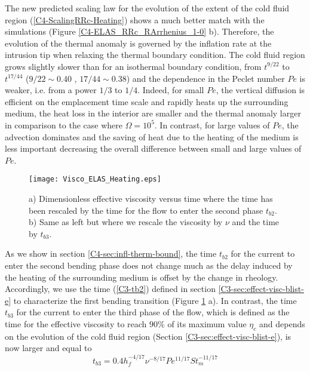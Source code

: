 The new predicted  scaling law for the evolution of  the extent of the
cold fluid  region (\ref{C4-ScalingRRc-Heating})  shows a  much better
match  with the  simulations (Figure  \ref{C4-ELAS_RRc_RArrhenius_1-0}
b). Therefore, the evolution of the thermal anomaly is governed by the
inflation rate at the intrusion tip when relaxing the thermal boundary
condition.  The  cold fluid region  grows slightly slower than  for an
isothermal   boundary  condition,   from  $t^{9/22}$   to  $t^{17/44}$
($9/22\sim 0.40$ , $17/44 \sim 0.38$) and the dependence in the Peclet
number $Pe$ is weaker, i.e. from  a power $1/3$ to $1/4$.  Indeed, for
small $Pe$,  the vertical  diffusion is  efficient on  the emplacement
time scale and rapidly heats up  the surrounding medium, the heat loss
in  the  interior  are  smaller  and the  thermal  anomaly  larger  in
comparison to the  case where $\Omega= 10^5$.  In  contrast, for large
values of $Pe$, the advection dominates  and the saving of heat due to
the heating  of the  medium is less  important decreasing  the overall
difference between small and large values of $Pe$.

\begin{figure}
  \begin{center}
    \graphicspath{ {/Users/thorey/Documents/These/Projet/Refroidissement/Skin_Model/Figure/Figure_Heating/} }
    \texttt{[image: Visco\_ELAS\_Heating.eps]}
    \caption{a)  Dimensionless effective  viscosity versus  time where
      the time has been rescaled by the time for the flow to enter the
      second phase $t_{b2}$. b) Same as  left but where we rescale the
      viscosity by $\nu$ and the time by $t_{b3}$.}
    \label{C4-Visco_ELAS_Heating}
  \end{center}
\end{figure}

As we show in section \ref{C4-sec:infl-therm-bound}, the time $t_{b2}$
for the current to enter the second bending phase does not change much
as  the delay  induced by  the heating  of the  surrounding medium  is
offset  by the  change  in  rheology.  Accordingly,  we  use the  time
(\ref{C3-tb2}) defined in  section \ref{C3-sec:effect-visc-blist-e} to
characterize     the     first      bending     transition     (Figure
\ref{C4-Visco_ELAS_Heating} a). In contrast, the time $t_{b3}$ for the
current to enter the third phase of  the flow, which is defined as the
time for the effective viscosity to  reach $90\%$ of its maximum value
$\eta_c$  and  depends on  the  evolution  of  the cold  fluid  region
(Section \ref{C3-sec:effect-visc-blist-e}), is now larger and equal to
\begin{equation}
  t_{b3}=0.4h_f^{-4/17}\nu^{-8/17}Pe^{11/17}St_m^{-11/17}
  \label{C4-tb3}
\end{equation}

